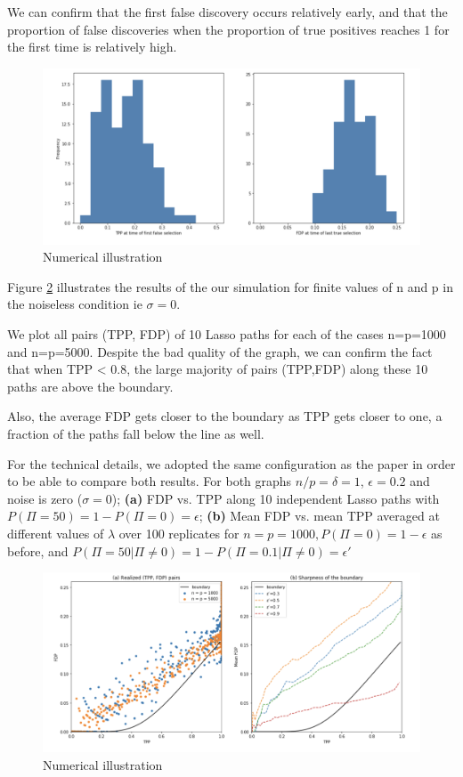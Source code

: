 \documentclass[10pt,onecolumn,letterpaper]{article}
\begin{document}
We can confirm that the first false discovery occurs relatively early, and that the proportion of false discoveries when the proportion of true positives reaches 1 for the first time is relatively high.

\begin{figure}[!htbp]
   \begin{center}
	\includegraphics[width=0.8\linewidth]{hist}
   \caption{Numerical illustration}
   \label{fig:hist}
   \end{center}
\end{figure}

Figure \ref{fig:numillustration} illustrates the results of the our simulation for finite values of n and p in the noiseless condition ie $\sigma = 0$. 

We plot all pairs (TPP, FDP) of 10 Lasso paths for each of the cases n=p=1000 and n=p=5000. Despite the bad quality of the graph, we can confirm the fact that when TPP < 0.8, the large majority of pairs (TPP,FDP) along these 10 paths are above the boundary.


Also, the average FDP gets closer to the boundary as TPP gets closer to one, a fraction of the paths fall below the line as well.
\newline

For the technical details, we adopted the same configuration as the paper in order to be able to compare both results. For both graphs $n/p = \delta = 1$, $\epsilon = 0.2$ and noise is zero ($\sigma = 0$);  \textbf{(a)} FDP vs. TPP along 10 independent Lasso paths with $P(\Pi = 50) = 1 - P(\Pi = 0) = \epsilon$;  \textbf{(b)} Mean FDP vs. mean TPP averaged at different values of $\lambda$ over 100 replicates for $n = p = 1000, P(\Pi = 0) = 1 - \epsilon$ as before, and $P(\Pi = 50| \Pi \neq 0) = 1 - P(\Pi = 0.1| \Pi \neq 0) = \epsilon \prime $


\begin{figure}[!htbp]
   \begin{center}
	\includegraphics[width=0.8\linewidth]{num_illustration}
   \caption{Numerical illustration}
   \label{fig:numillustration}
   \end{center}
\end{figure}
\end{document}
